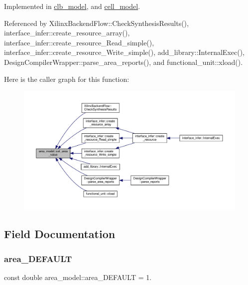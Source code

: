 Implemented in \hyperlink{classclb__model_ab3e3b52cff76fd2e46d9ac84b83dd456}{clb\+\_\+model}, and \hyperlink{classcell__model_a8b10f91f2160785c5b71d22af01eb127}{cell\+\_\+model}.



Referenced by Xilinx\+Backend\+Flow\+::\+Check\+Synthesis\+Results(), interface\+\_\+infer\+::create\+\_\+resource\+\_\+array(), interface\+\_\+infer\+::create\+\_\+resource\+\_\+\+Read\+\_\+simple(), interface\+\_\+infer\+::create\+\_\+resource\+\_\+\+Write\+\_\+simple(), add\+\_\+library\+::\+Internal\+Exec(), Design\+Compiler\+Wrapper\+::parse\+\_\+area\+\_\+reports(), and functional\+\_\+unit\+::xload().

Here is the caller graph for this function\+:
\nopagebreak
\begin{figure}[H]
\begin{center}
\leavevmode
\includegraphics[width=350pt]{d3/d16/classarea__model_a7c533a6a1b352493c04980d0734f89e5_icgraph}
\end{center}
\end{figure}


\subsection{Field Documentation}
\mbox{\label{classarea__model_a6a0342e6f7fd957572096e1c2a4d8406}} 
\subsubsection{\texorpdfstring{area\+\_\+\+D\+E\+F\+A\+U\+LT}{area\_DEFAULT}}
{\footnotesize\ttfamily const double area\+\_\+model\+::area\+\_\+\+D\+E\+F\+A\+U\+LT = 1.\hspace{0.3cm}{\ttfamily [static]}}



